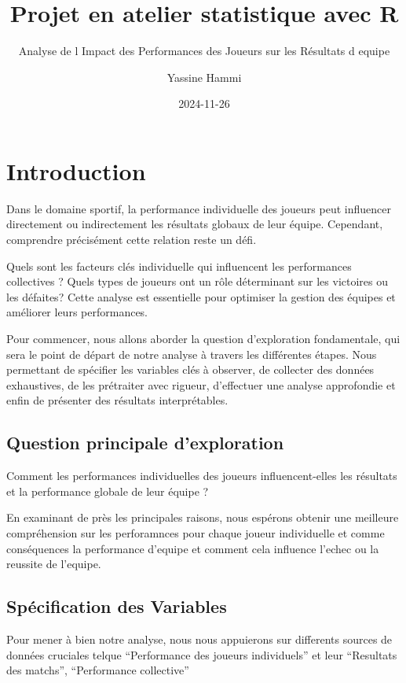 \documentclass[
  6pt,
]{article}
\title{Projet en atelier statistique avec R}
\subtitle{Analyse de l Impact des Performances des Joueurs sur les
Résultats d equipe}
\author{Yassine Hammi}
\date{2024-11-26}
\begin{document}
\maketitle

{
\setcounter{tocdepth}{6}
\tableofcontents
}
\section{Introduction}\label{introduction}

Dans le domaine sportif, la performance individuelle des joueurs peut
influencer directement ou indirectement les résultats globaux de leur
équipe. Cependant, comprendre précisément cette relation reste un défi.

Quels sont les facteurs clés individuelle qui influencent les
performances collectives ? Quels types de joueurs ont un rôle
déterminant sur les victoires ou les défaites? Cette analyse est
essentielle pour optimiser la gestion des équipes et améliorer leurs
performances.

Pour commencer, nous allons aborder la question d'exploration
fondamentale, qui sera le point de départ de notre analyse à travers les
différentes étapes. Nous permettant de spécifier les variables clés à
observer, de collecter des données exhaustives, de les prétraiter avec
rigueur, d'effectuer une analyse approfondie et enfin de présenter des
résultats interprétables.

\subsection{Question principale
d'exploration}\label{question-principale-dexploration}

Comment les performances individuelles des joueurs influencent-elles les
résultats et la performance globale de leur équipe ?

En examinant de près les principales raisons, nous espérons obtenir une
meilleure compréhension sur les perforamnces pour chaque joueur
individuelle et comme conséquences la performance d'equipe et comment
cela influence l'echec ou la reussite de l'equipe.

\subsection{Spécification des
Variables}\label{spuxe9cification-des-variables}

Pour mener à bien notre analyse, nous nous appuierons sur differents
sources de données cruciales telque ``Performance des joueurs
individuels'' et leur ``Resultats des matchs'', ``Performance
collective''
\end{document}
